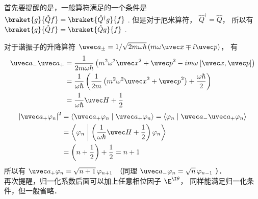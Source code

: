 
首先要提醒的是，一般算符满足的一个条件是 $\braket{g}{\hat Q f}=\braket{\hat Q^\dagger g}{ f}$ . 但是对于厄米算符， ${\hat Q^\dagger } = \hat Q$，  所以有 $\braket{g}{\hat Q f} = \braket{\hat Q g}{f}$ .

对于谐振子的升降算符 ${\uvec a_ \pm } = {1}/{{\sqrt {2m\omega \hbar } }}\left( {m\omega \uvec x \mp i\uvec p} \right)$， 有
\begin{equation}\begin{aligned}
{\uvec a_ - }{\uvec a_ + } &= \frac{1}{{2m\omega \hbar }}\left( {{m^2}{\omega ^2}{{\uvec x}^2} + {{\uvec p}^2} - im\omega {\kern 1pt} {\kern 1pt} [\uvec x,\uvec p]} \right) \\
&= \frac{1}{{\omega \hbar }}\left( {\frac{1}{{2m}}\left( {{m^2}{\omega ^2}{{\uvec x}^2} + {{\uvec p}^2}} \right) + \frac{{\omega \hbar }}{2}} \right) \\
&= \frac{1}{{\omega \hbar }}\uvec H + \frac{1}{2}
\end{aligned}\end{equation}
\begin{equation}\begin{aligned}
{\left| {{{\uvec a}_ + }{\varphi_n}} \right|^2} &= \left\langle {{{{\uvec a}_ + }{\varphi_n}}}
\mathrel{\left | {\vphantom {{{{\uvec a}_ + }{\varphi_n}} {{{\uvec a}_ + }{\varphi_n}}}}
\right. \kern-\nulldelimiterspace}
{{{{\uvec a}_ + }{\varphi_n}}} \right\rangle = \left\langle {{{\varphi_n}}}
\mathrel{\left | {\vphantom {{{\varphi_n}} {{{\uvec a}_ - }{{\uvec a}_ + }{\varphi_n}}}}
\right. \kern-\nulldelimiterspace}
{{{{\uvec a}_ - }{{\uvec a}_ + }{\varphi_n}}} \right\rangle  \\
&= \left\langle {{{\varphi_n}}}
\mathrel{\left | {\vphantom {{{\varphi_n}} {\left( {\frac{1}{{\omega \hbar }}\uvec H + \frac{1}{2}} \right){\varphi_n}}}}
\right. \kern-\nulldelimiterspace}
{{\left( {\frac{1}{{\omega \hbar }}\uvec H + \frac{1}{2}} \right){\varphi_n}}} \right\rangle \\
&= \left( {n + \frac{1}{2}} \right) + \frac{1}{2} = n + 1
\end{aligned}\end{equation}
所以有 ${\uvec a_ + }{\varphi_n} = \sqrt {n + 1}\, {\varphi_{n + 1}}$ （同理 ${\uvec a_ - }{\varphi_n} = \sqrt n \,{\varphi_{n - 1}}$ ）．\\
再次提醒，归一化系数后面可以加上任意相位因子 ${\E^{\I\theta }}$， 同样能满足归一化条件，但一般省略．